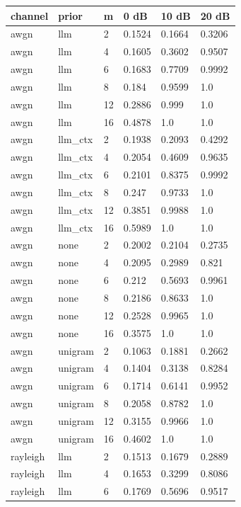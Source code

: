 \begin{tabular}{llllll}
\hline
channel & prior & m & 0 dB & 10 dB & 20 dB \\
\hline
awgn & llm & 2 & 0.1524 & 0.1664 & 0.3206 \\
awgn & llm & 4 & 0.1605 & 0.3602 & 0.9507 \\
awgn & llm & 6 & 0.1683 & 0.7709 & 0.9992 \\
awgn & llm & 8 & 0.184 & 0.9599 & 1.0 \\
awgn & llm & 12 & 0.2886 & 0.999 & 1.0 \\
awgn & llm & 16 & 0.4878 & 1.0 & 1.0 \\
awgn & llm\_ctx & 2 & 0.1938 & 0.2093 & 0.4292 \\
awgn & llm\_ctx & 4 & 0.2054 & 0.4609 & 0.9635 \\
awgn & llm\_ctx & 6 & 0.2101 & 0.8375 & 0.9992 \\
awgn & llm\_ctx & 8 & 0.247 & 0.9733 & 1.0 \\
awgn & llm\_ctx & 12 & 0.3851 & 0.9988 & 1.0 \\
awgn & llm\_ctx & 16 & 0.5989 & 1.0 & 1.0 \\
awgn & none & 2 & 0.2002 & 0.2104 & 0.2735 \\
awgn & none & 4 & 0.2095 & 0.2989 & 0.821 \\
awgn & none & 6 & 0.212 & 0.5693 & 0.9961 \\
awgn & none & 8 & 0.2186 & 0.8633 & 1.0 \\
awgn & none & 12 & 0.2528 & 0.9965 & 1.0 \\
awgn & none & 16 & 0.3575 & 1.0 & 1.0 \\
awgn & unigram & 2 & 0.1063 & 0.1881 & 0.2662 \\
awgn & unigram & 4 & 0.1404 & 0.3138 & 0.8284 \\
awgn & unigram & 6 & 0.1714 & 0.6141 & 0.9952 \\
awgn & unigram & 8 & 0.2058 & 0.8782 & 1.0 \\
awgn & unigram & 12 & 0.3155 & 0.9966 & 1.0 \\
awgn & unigram & 16 & 0.4602 & 1.0 & 1.0 \\
rayleigh & llm & 2 & 0.1513 & 0.1679 & 0.2889 \\
rayleigh & llm & 4 & 0.1653 & 0.3299 & 0.8086 \\
rayleigh & llm & 6 & 0.1769 & 0.5696 & 0.9517 \\

\end{tabular}
